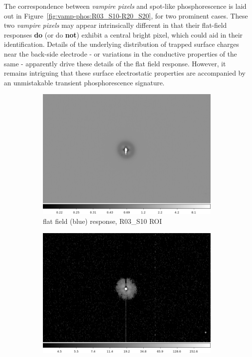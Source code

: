 

The correspondence between {\it vampire pixels} and spot-like phosphorescence is laid out in Figure~\ref{fig:vamp-phos:R03_S10-R20_S20}, for two prominent cases.  These two {\it vampire pixels} may appear intrinsically different in that their flat-field responses {\bf do} (or do {\bf not}) exhibit a central bright pixel, which could aid in their identification. Details of the underlying distribution of trapped surface charges near the back-side electrode - or variations in the conductive properties of the same - apparently drive these details of the flat field response. However, it remains intriguing that these surface electrostatic properties are accompanied by an unmistakable transient phosphorescence signature.


\begin{figure}[!htbp]
\centering
\begin{subfigure}{0.45\textwidth}
    \includegraphics[width=\textwidth]{figures/phosphorescence-survey/vamp_comp_R03_S10_flatresp.png}
     \caption{flat field (blue) response, R03\_S10 ROI}
     \label{subfig:flatresp_R03_S10}
\end{subfigure}
\begin{subfigure}{0.45\textwidth}
    \includegraphics[width=\textwidth]{figures/phosphorescence-survey/vamp_comp_R03_S10_phosresp.png}

\end{subfigure}
\end{figure}
